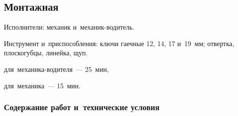 \subsection{Монтажная}
\noindent
Исполнители: механик и~механик-водитель. 

\noindent
Инструмент и~приспособления: ключи гаечные 12, 14, 17 и~19~мм; отвертка, плоскогубцы, линейка, щуп. 

\begin{standarttime}
    \item для~механика-водителя~--- 25~мин,
    \item для~механика~--- 15~мин.
\end{standarttime}

\subsubsection{Содержание работ и~технические условия}
